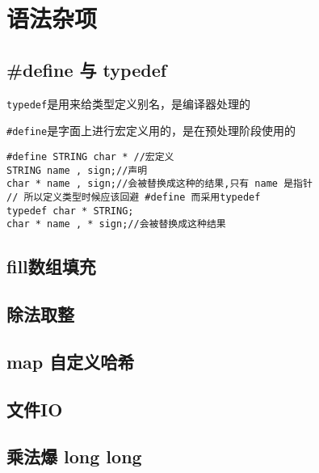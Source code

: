 \section{语法杂项}

\subsection{#define 与 typedef}
\verb|typedef|是用来给类型定义别名，是编译器处理的

\verb|#define|是字面上进行宏定义用的，是在预处理阶段使用的
\begin{lstlisting}
#define STRING char * //宏定义
STRING name , sign;//声明
char * name , sign;//会被替换成这种的结果,只有 name 是指针
// 所以定义类型时候应该回避 #define 而采用typedef
typedef char * STRING;
char * name , * sign;//会被替换成这种结果
\end{lstlisting}

\subsection{fill数组填充}


\subsection{除法取整}


\subsection{map 自定义哈希}


\subsection{文件IO}


\subsection{乘法爆 long long }
